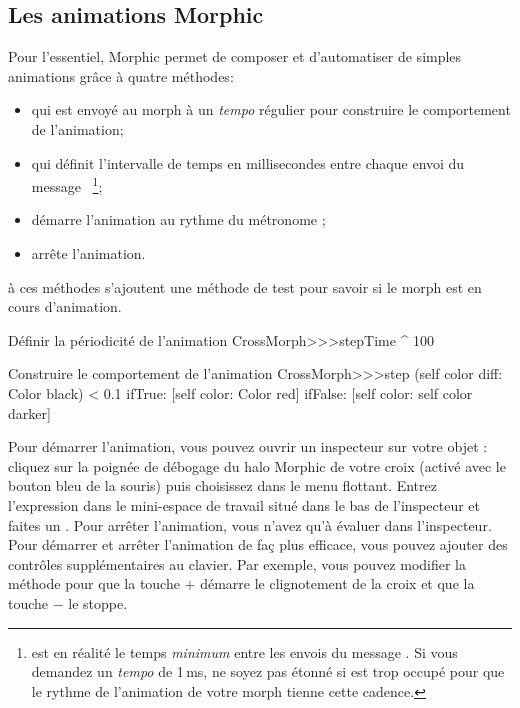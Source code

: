 \documentclass[a4paper,10pt,twoside]{book}
\begin{document}
\subsection{Les animations Morphic}

Pour l'essentiel, Morphic permet de composer et d'automatiser de
simples animations grâce à quatre méthodes:
\begin{itemize}
\item {} qui est envoyé au morph à un
  \emph{tempo} régulier pour construire le comportement de l'animation;
\item {} qui définit l'intervalle de temps en
  millisecondes entre chaque envoi du message ~\footnote{ est
    en réalité le temps \emph{minimum} entre les envois du message
    . Si vous demandez un \emph{tempo}  de
    1\,ms, ne soyez pas étonné si \pharo est trop occupé pour que
    le rythme de l'animation de votre morph tienne cette cadence.};
\item {} démarre l'animation au rythme
  du métronome ;
\item {} arrête l'animation.
\end{itemize}

à ces méthodes s'ajoutent une méthode de test
 pour savoir si le morph est en cours
d'animation.%

\begin{method}{Définir la périodicité de l'animation}
CrossMorph>>>stepTime
	^ 100
\end{method}
\begin{method}{Construire le comportement de l'animation}
CrossMorph>>>step
	(self color diff: Color black) < 0.1
		ifTrue: [self color: Color red]
		ifFalse: [self color: self color darker]
\end{method}
\noindent
Pour démarrer l'animation, vous pouvez ouvrir un inspecteur sur
votre objet : cliquez sur la poignée de débogage 
\debugHandle{} du halo Morphic de votre croix (activé avec le
bouton bleu de la souris) puis choisissez  dans le
menu flottant. Entrez l'expression  dans le
mini-espace de travail situé dans le bas de l'inspecteur et faites
un .
Pour arrêter l'animation, vous n'avez qu'à évaluer  dans l'inspecteur. 
Pour démarrer et arrêter l'animation de faç plus efficace, vous pouvez
ajouter des contrôles supplémentaires au clavier. Par exemple,
vous pouvez modifier la méthode  pour que la
touche $+$ démarre le clignotement de la croix et que la touche $-$
le stoppe.
\end{document}
